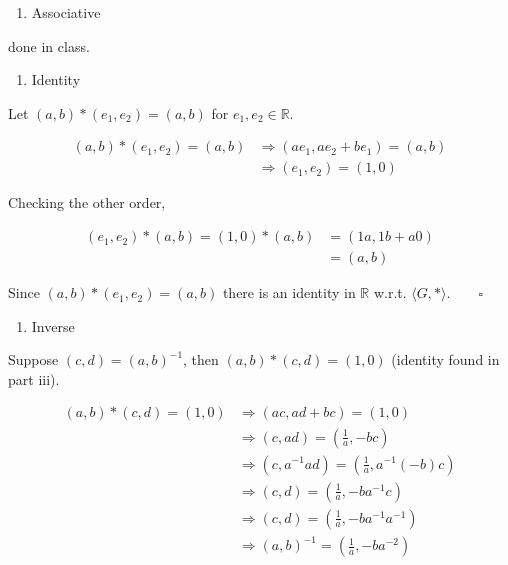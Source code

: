 \documentclass[
]{article}
\providecommand{\tightlist}{%
  \setlength{\itemsep}{0pt}\setlength{\parskip}{0pt}}
\begin{document}
\begin{enumerate}
\def\labelenumi{(\roman{enumi})}
\setcounter{enumi}{1}
\tightlist
\item
  Associative
\end{enumerate}

done in class.

\begin{enumerate}
\def\labelenumi{(\roman{enumi})}
\setcounter{enumi}{2}
\tightlist
\item
  Identity
\end{enumerate}

Let \((a,b)*(e_1,e_2)=(a,b)\) for \(e_1,e_2\in\mathbb{R}\).

\begin{equation}
\label{4iii1}
\begin{split}
(a,b)*(e_1,e_2)=(a,b)&\Rightarrow (ae_1,ae_2+be_1)=(a,b) \\
&\Rightarrow (e_1,e_2)=(1,0)
\end{split}
\end{equation}

Checking the other order,

\begin{equation}
\label{4iii2}
\begin{split}
(e_1,e_2)*(a,b)=(1,0)*(a,b) &= (1a,1b+a0) \\
&= (a,b)
\end{split}
\end{equation}

Since \((a,b)*(e_1,e_2)=(a,b)\) there is an identity in \(\mathbb{R}\)
w.r.t. \(\langle G,*\rangle\).\(\quad\quad\square\)

\begin{enumerate}
\def\labelenumi{(\roman{enumi})}
\setcounter{enumi}{3}
\tightlist
\item
  Inverse
\end{enumerate}

Suppose \((c,d)=(a,b)^{-1}\), then \((a,b)*(c,d)=(1,0)\) (identity found
in part iii).

\begin{equation}
\label{4iv}
\begin{split}
(a,b)*(c,d)=(1,0)&\Rightarrow(ac,ad+bc)=(1,0) \\
&\Rightarrow (c,ad)=(\frac{1}{a},-bc)\\
&\Rightarrow (c,a^{-1}ad)=(\frac{1}{a},a^{-1}(-b)c)\\
&\Rightarrow (c,d)=(\frac{1}{a},-ba^{-1}c)\\
&\Rightarrow (c,d)=(\frac{1}{a},-ba^{-1}a^{-1})\\
&\Rightarrow (a,b)^{-1}=(\frac{1}{a},-ba^{-2})
\end{split}
\end{equation}
\end{document}
